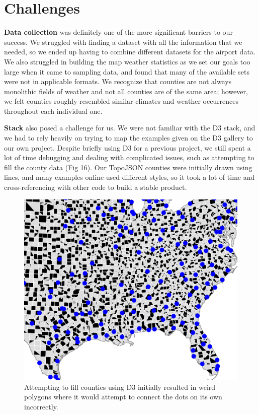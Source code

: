 \documentclass[10pt,twocolumn,twoside]{opticajnl}
\begin{document}
\section {Challenges}

\textbf{Data collection} was definitely one of the more significant barriers to our success. We struggled with finding a dataset with all the information that we needed, so we ended up having to combine different datasets for the airport data. We also struggled in building the map weather statistics as we set our goals too large when it came to sampling data, and found that many of the available sets were not in applicable formats. We recognize that counties are not always monolithic fields of weather and not all counties are of the same area; however, we felt counties roughly resembled similar climates and weather occurrences throughout each individual one. 

\textbf{Stack} also posed a challenge for us. We were not familiar with the D3 stack, and we had to rely heavily on trying to map the examples given on the D3 gallery \cite{d3_2020_gallery} to our own project. Despite briefly using D3 for a previous project, we still spent a lot of time debugging and dealing with complicated issues, such as attempting to fill the county data (Fig 16). Our TopoJSON counties were initially drawn using lines, and many examples online used different styles, so it took a lot of time and cross-referencing with other code to build a stable product.

\begin{figure}
	\centering
	\includegraphics[scale=0.5]{images/countiesBroken.png}
	\caption{Attempting to fill counties using D3 initially resulted in weird polygons where it would attempt to connect the dots on its own incorrectly.}
\end{figure}
\end{document}
